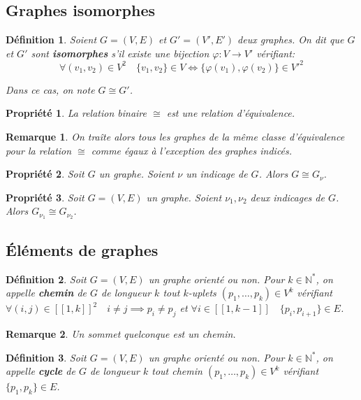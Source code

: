 \documentclass[french,a4paper]{article}
\newtheorem{definition}{Définition}[section]
\newtheorem{property}{Propriété}[section]
\newtheorem{remark}{Remarque}[section]
\begin{document}
\subsection{Graphes isomorphes}
\begin{definition}
Soient $G=(V,E)$ et $G'=(V',E')$ deux graphes.
On dit que $G$ et $G'$ sont \textbf{isomorphes} s'il existe une bijection $\varphi : V \to V'$ vérifiant:
\[
\forall (v_1,v_2) \in V^2 \quad \{v_1,v_2\} \in V \iff \{ \varphi(v_1),\varphi(v_2) \} \in V'^2
\]

Dans ce cas, on note $G \cong G'$.
\end{definition}

\begin{property}
La relation binaire $\cong$ est une relation d'équivalence.
\end{property}

\begin{remark}
On traîte alors tous les graphes de la même classe d'équivalence pour la relation $\cong$ comme égaux à l'exception des graphes indicés.
\end{remark}

\begin{property}
Soit $G$ un graphe.
Soient $\nu$ un indicage de $G$. Alors $G \cong G_{\nu}$.
\end{property}

\begin{property}
Soit $G=(V,E)$ un graphe.
Soient $\nu_1, \nu_2$ deux indicages de $G$. Alors $G_{\nu_1} \cong G_{\nu_2}$.
\end{property}

\subsection{Éléments de graphes}

\begin{definition}
Soit $G=(V,E)$ un graphe orienté ou non.
Pour $k \in \mathbb{N}^*$, on appelle \textbf{chemin} de $G$ de longueur $k$ tout $k$-uplets $(p_1,\dots,p_k) \in V^k$ vérifiant $\forall (i,j) \in [\![1,k]\!]^2 \quad i \neq j \implies p_i \neq p_j$ et $\forall i \in [\![1,k-1]\!] \quad \{p_i,p_{i+1}\} \in E$.
\end{definition}

\begin{remark}
Un sommet quelconque est un chemin.
\end{remark}

\begin{definition}
Soit $G=(V,E)$ un graphe orienté ou non.
Pour $k \in \mathbb{N}^*$, on appelle \textbf{cycle} de $G$ de longueur $k$ tout chemin $(p_1,\dots,p_k) \in V^k$ vérifiant $\{p_1,p_k\} \in E$.
\end{definition}
\end{document}

